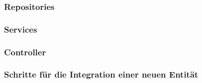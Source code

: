 \subsubsection{Repositories}


\subsubsection{Services}

\subsubsection{Controller}

\subsubsection{Schritte für die Integration einer neuen Entität}
